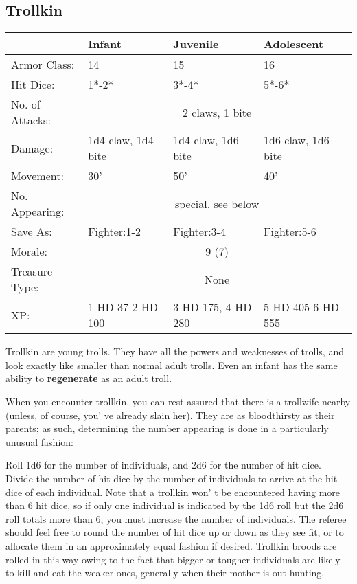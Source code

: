 \documentclass[a4paper,twoside,openany,10pt]{book}
\begin{document}
\begin{multicols}{2}
	
\subsection*{Trollkin}\label{trollkin}

\begin{tabularx}{0.50\textwidth}{@{}lXXX@{}}
& \textbf{Infant} & \textbf{Juvenile} & \textbf{Adolescent} \\\hline
Armor Class: & 14 & 15 & 16 \\\hline
Hit Dice: & 1*-2* & 3*-4* & 5*-6* \\\hline
No. of Attacks: & \multicolumn{3}{c}{2 claws, 1 bite} \\\hline
Damage: & 1d4 claw, 1d4 bite & 1d4 claw, 1d6 bite & 1d6 claw, 1d6 bite \\\hline
Movement: & 30' & 50' & 40' \\\hline
No. Appearing: &  \multicolumn{3}{c}{special, see below}\\\hline
Save As: & Fighter:1-2 & Fighter:3-4 & Fighter:5-6 \\\hline
Morale: & \multicolumn{3}{c}{9 (7)} \\\hline
Treasure Type: & \multicolumn{3}{c}{None} \\\hline
XP: &1 HD 37  2 HD 100 & 3 HD 175, 4 HD 280 & 5 HD 405 6 HD 555 \\\hline
\end{tabularx}\medskip

Trollkin are young trolls. They have all the powers and weaknesses of trolls, and look exactly like smaller than normal adult trolls. Even an infant has the same ability to \textbf{regenerate} as an adult troll. 

When you encounter trollkin, you can rest assured that there is a trollwife nearby (unless, of course, you' ve already slain her). They are as bloodthirsty as their parents; as such, determining the number appearing is done in a particularly unusual fashion:

Roll 1d6 for the number of individuals, and 2d6 for the number of hit dice. Divide the number of hit dice by the number of individuals to arrive at the hit dice of each individual. Note that a trollkin won' t be encountered having more than 6 hit dice, so if only one individual is indicated by the 1d6 roll but the 2d6 roll totals more than 6, you must increase the number of individuals. The referee should feel free to round the number of hit dice up or down as they see fit, or to allocate them in an approximately equal fashion if desired. Trollkin broods are rolled in this way owing to the fact that bigger or tougher individuals are likely to kill and eat the weaker ones, generally when their mother is out hunting.


\end{multicols}
\end{document}
